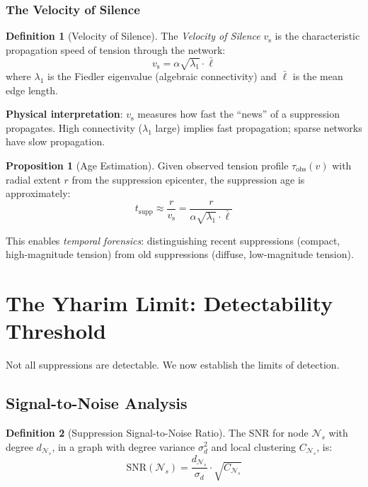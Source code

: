 \documentclass[11pt,a4paper]{article}
\theoremstyle{definition}
\newtheorem{definition}{Definition}[section]
\newtheorem{proposition}[theorem]{Proposition}
\theoremstyle{remark}
\newcommand{\NS}{\mathcal{N}_s}
\newcommand{\vsilence}{v_{\mathrm{s}}}
\begin{document}
\subsubsection{The Velocity of Silence}

\begin{definition}[Velocity of Silence]
\label{def:velocity}
The \emph{Velocity of Silence} $\vsilence$ is the characteristic propagation speed of tension through the network:
\begin{equation}
    \boxed{
    \vsilence = \alpha \sqrt{\lambda_1} \cdot \bar{\ell}
    }
\end{equation}
where $\lambda_1$ is the Fiedler eigenvalue (algebraic connectivity) and $\bar{\ell}$ is the mean edge length.
\end{definition}

\textbf{Physical interpretation}: $\vsilence$ measures how fast the ``news'' of a suppression propagates. High connectivity ($\lambda_1$ large) implies fast propagation; sparse networks have slow propagation.

\begin{proposition}[Age Estimation]
\label{prop:age}
Given observed tension profile $\tau_{\text{obs}}(v)$ with radial extent $r$ from the suppression epicenter, the suppression age is approximately:
\begin{equation}
    t_{\text{supp}} \approx \frac{r}{\vsilence} = \frac{r}{\alpha \sqrt{\lambda_1} \cdot \bar{\ell}}
\end{equation}
\end{proposition}

This enables \emph{temporal forensics}: distinguishing recent suppressions (compact, high-magnitude tension) from old suppressions (diffuse, low-magnitude tension).

\section{The Yharim Limit: Detectability Threshold}

Not all suppressions are detectable. We now establish the limits of detection.

\subsection{Signal-to-Noise Analysis}

\begin{definition}[Suppression Signal-to-Noise Ratio]
The SNR for node $\NS$ with degree $d_{\NS}$, in a graph with degree variance $\sigma_d^2$ and local clustering $C_{\NS}$, is:
\begin{equation}
    \text{SNR}(\NS) = \frac{d_{\NS}}{\sigma_d} \cdot \sqrt{C_{\NS}}
\end{equation}
\end{definition}
\end{document}
